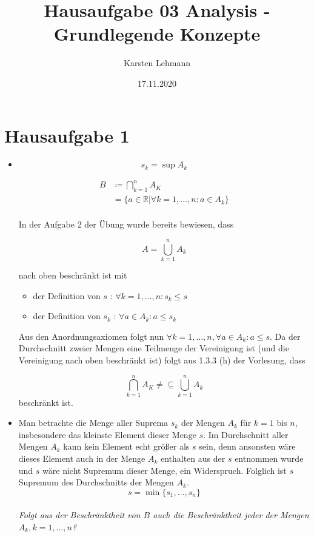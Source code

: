 \documentclass{article}
\author{Karsten Lehmann}
\date{17.11.2020}
\title{Hausaufgabe 03 Analysis - Grundlegende Konzepte}
\begin{document}
\maketitle
\newpage

\section*{Hausaufgabe 1}
\begin{itemize}
\item
  \[
    s_k = \sup A_k
  \]
  
  \begin{align*}
    B &\coloneqq \bigcap_{k = 1}^n A_K \\
      &= \{ a \in \mathbb{R} | \forall k = 1, \ldots, n \colon  a \in A_k \} \\
  \end{align*}
  
  In der Aufgabe 2 der Übung wurde bereits bewiesen, dass
  
  \[
    A = \bigcup_{k = 1}^n A_k
  \]
  
  nach oben beschränkt ist mit
  \begin{itemize}
  \item der Definition von $s$ : $\forall k = 1, \ldots, n \colon s_k \leq s$
  \item der Definition von $s_k$ : $\forall a \in A_k \colon a \leq s_k$
  \end{itemize}

  Aus den Anordnungsaxiomen folgt nun $\forall k = 1, \ldots, n, \forall a \in A_k \colon a \leq s$. Da der Durchschnitt zweier Mengen eine
  Teilmenge der Vereinigung ist (und die Vereinigung nach oben beschränkt ist) folgt aus 1.3.3 (h) der Vorlesung, dass
  
  \[
    \bigcap_{k = 1}^n A_K \ne \subseteq \bigcup_{k = 1}^n A_k
  \]
  beschränkt ist. \\
\item
  Man betrachte die Menge aller Suprema $s_k$ der Mengen $A_k$ für $k = 1$ bis $n$, insbesondere das kleinste Element dieser Menge $s$.
  Im Durchschnitt aller Mengen $A_k$ kann kein Element echt größer als $s$ sein, denn ansonsten wäre dieses Element
  auch in der Menge $A_k$ enthalten aus der $s$ entnommen wurde und $s$ wäre nicht Supremum dieser Menge, ein Widerspruch.
  Folglich ist $s$ Supremum des Durchschnitts der Mengen $A_k$.
  \[
    s = \min \{ s_1, \ldots, s_n \}
  \] \\

  \emph{Folgt aus der Beschränktheit von $B$ auch die Beschränktheit jeder der Mengen $A_k, k = 1, \ldots, n$?}


\end{itemize}
\end{document}
